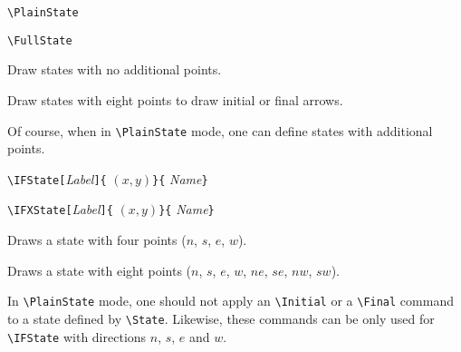 \documentclass[11pt,twoside]{article}
\newlength{\ColoText}%
\newlength{\ColoFigu}%
\newlength{\parindenttemp} %
\newcommand{\noi}{\noindent}
\newlength{\jsIndent}%
\begin{document}
\noi 
\hspace*{-\jsIndent}
\begin{minipage}[t]{\ColoText}
        \par\vspace*{0mm}%
        \footnotesize
\verb+\PlainState+
   
\medskip 
\verb+\FullState+ 
   
\medskip 
\end{minipage}%
\hspace*{1.2em}%
\begin{minipage}[t]{\ColoFigu}%
\par\vspace*{0mm}%
Draw states with no additional points.

\smallskip 

Draw states with eight points to draw initial or final arrows.
\end{minipage}%

Of course, when in \verb+\PlainState+ mode, one can define states
with additional points.

\noi 
\hspace*{-\jsIndent}
\begin{minipage}[t]{\ColoText}
        \par\vspace*{0mm}%
        \footnotesize
\verb+\IFState[+\textsl{Label}\verb+]{+%
   $(x,y)$\verb+}{+%
   \textsl{Name}\verb+}+
   
\medskip 
\verb+\IFXState[+\textsl{Label}\verb+]{+%
   $(x,y)$\verb+}{+%
   \textsl{Name}\verb+}+
   
\medskip 
\end{minipage}%
\hspace*{1.2em}%
\begin{minipage}[t]{\ColoFigu}%
\par\vspace*{0mm}%
Draws a state with four points ($n$, $s$, $e$, $w$).

\smallskip 

Draws a state with eight points ($n$, $s$, $e$, $w$, $ne$, $se$, $nw$, $sw$).
\end{minipage}%

In \verb+\PlainState+ mode, one should not apply an \verb+\Initial+
or a \verb+\Final+ command to a state defined by \verb+\State+.
Likewise, these commands can be only used for \verb+\IFState+
with directions $n$, $s$, $e$ and $w$.
\end{document}

